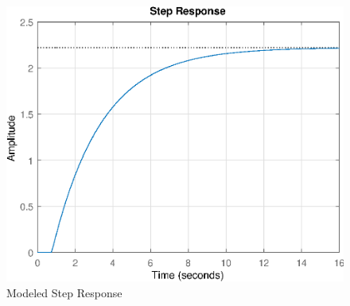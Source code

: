 \begin{figure}[H]
	\centering
	\includegraphics[width=1\textheight, height = 1\textwidth, keepaspectratio,  angle = 270]{figures/06ModelValidation/modeledStepResponse.eps}
	\caption{Modeled Step Response}
\end{figure}
